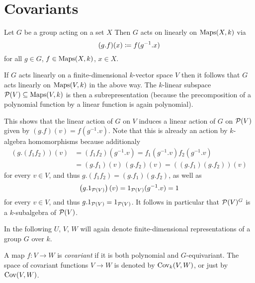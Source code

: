 \section{Covariants}


\begin{fluff}
  \label{fluff: induced action on polynomial algebra}
  Let $G$ be a group acting on a set $X$
  Then $G$ acts on linearly on $\operatorname{Maps}(X,k)$ via
  \[
              (g.f)(x)
    \coloneqq  f(g^{-1}.x)
  \]
  for all $g \in G$, $f \in \operatorname{Maps}(X,k)$, $x \in X$.
  
  If $G$ acts linearly on a finite-dimensional $k$-vector space $V$ then it follows that $G$ acts linearly on $\operatorname{Maps}(V,k)$ in the above way.
  The $k$-linear subspace $\mathcal{P}(V) \subseteq \operatorname{Maps}(V,k)$ is then a subrepresentation (because the precomposition of a polynomial function by a linear function is again polynomial).
  
  This shows that the linear action of $G$ on $V$ induces a linear action of $G$ on $\mathcal{P}(V)$ given by $(g.f)(v) = f(g^{-1}.v)$.
  Note that this is already an action by $k$-algebra homomorphisms because additionaly
  \begin{align*}
        (g.(f_1 f_2))(v)
    &=  (f_1 f_2)(g^{-1}.v)
     =  f_1(g^{-1}.v) f_2(g^{-1}.v) \\
    &=  (g.f_1)(v) \, (g.f_2)(v)
     =  ((g.f_1) (g.f_2))(v)
  \end{align*}
  for every $v \in V$, and thus $g.(f_1 f_2) = (g.f_1)(g.f_2)$, as well as
  \[
      \left( g.1_{\mathcal{P}(V)} \right)(v)
    = 1_{\mathcal{P}(V)}(g^{-1}.v)
    = 1
  \]
  for every $v \in V$, and thus $g.1_{\mathcal{P}(V)} = 1_{\mathcal{P}(V)}$.
  It follows in particular that $\mathcal{P}(V)^G$ is a $k$-subalgebra of $\mathcal{P}(V)$.
  
  In the following $U$, $V$, $W$ will again denote finite-dimensional representations of a group $G$ over $k$.
\end{fluff}


\begin{definition}
  A map $f \colon V \to W$ is \emph{covariant} if it is both polynomial and $G$-equivariant.
  The space of covariant functions $V \to W$ is denoted by $\operatorname{Cov}_k(V,W)$, or just by $\operatorname{Cov}(V,W)$.
\end{definition}



